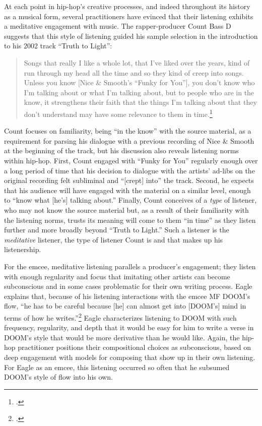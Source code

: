 At each point in hip-hop's creative processes, and indeed throughout its history as a musical form, several 
practitioners have evinced that their listening exhibits a meditative engagement with music. The rapper-producer
Count Bass D suggests that this style of listening guided his sample selection in the introduction to his 2002
track ``Truth to Light'': 
    \begin{quote}
        Songs that really I like a whole lot, that I've liked over the years, kind of run through my head all
        the time and so they kind of creep into songs. \textellipsis Unless you know [Nice \& Smooth's ``Funky
        for You''], you don't know who I'm talking about or what I'm talking about, but to people who are in
        the know, it strengthens their faith that the things I'm talking about that they don't understand may
        have some relevance to them in time.\footnote{
            \autocite[100]{mickeyhessHipHopDead2007}.}
    \end{quote}
Count focuses on familiarity, being ``in the know'' with the source material, as a requirement for parsing 
his dialogue with a previous recording of Nice \& Smooth at the beginning of the track, but his discussion also
reveals listening norms within hip-hop. First, Count engaged with ``Funky for You'' regularly enough over a long
period of time that his decision to dialogue with the artists' ad-libs on the original recording felt subliminal
and ``[crept] into'' the track. Second, he expects that his audience will have engaged with the material on a 
similar level, enough to ``know what [he's] talking about.'' Finally, Count conceives of a \emph{type} of listener,
who may not know the source material but, as a result of their familiarity with the listening norms, trusts its 
meaning will come to them ``in time'' as they listen further and more broadly beyond ``Truth to Light.'' Such a 
listener is the \emph{meditative} listener, the type of listener Count is and that makes up his listenership.

For the emcee, meditative listening parallels a producer's engagement; they listen with enough regularity and
focus that imitating other artists can become subconscious and in some cases problematic for their own writing
process. Eagle explains that, because of his listening interactions with the emcee MF DOOM's flow, ``he has to
be careful \textellipsis because [he] can almost get into [DOOM's] mind in terms of how he writes.''\footnote{
    \cite{estellecaswellRappingDeconstructedBest2016}.} 
Eagle characterizes listening to DOOM with such frequency, regularity, and depth that it would be easy for him
to write a verse in DOOM's style that would be more derivative than he would like. Again, the hip-hop practitioner
positions their compositional choices as subconscious, based on deep engagement with models for composing that
show up in their own listening. For Eagle as an emcee, this listening occurred so often that he subsumed DOOM's
style of flow into his own.

